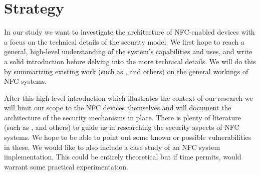 \documentclass[11pt]{article} %
\begin{document}
\section{Strategy}
In our study we want to investigate the architecture of NFC-enabled devices with a focus on the technical details of the security model.
We first hope to reach a general, high-level understanding of the system's capabilities and uses, and write a solid introduction before delving into the more technical details.
We will do this by summarizing existing work (such as \cite{Paus2007}, \cite{1731794} and others) on the general workings of NFC systems.

After this high-level introduction which illustrates the context of our research we will limit our scope to the NFC devices themselves and will document the architecture of the security mechanisms in place.
There is plenty of literature (such as \cite{mulliner09:vulnanamms}, \cite{Kfir05pickingvirtual} and others) to guide us in researching the security aspects of NFC systems. 
We hope to be able to point out some known or possible vulnerabilities in these.
We would like to also include a case study of an NFC system implementation.
This could be entirely theoretical but if time permits, would warrant some practical experimentation.
\end{document}
